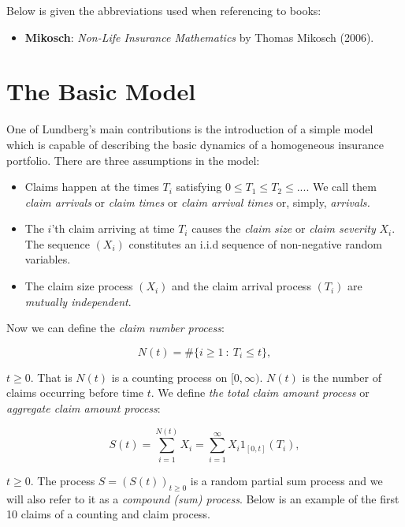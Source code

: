 \documentclass[a4paper,10pt,openany]{book}
\providecommand{\tightlist}{%
 \setlength{\itemsep}{0pt}\setlength{\parskip}{0pt}}
\begin{document}
Below is given the abbreviations used when referencing to books:

\begin{itemize}
\tightlist
\item
  \textbf{Mikosch}: \emph{Non-Life Insurance Mathematics} by Thomas Mikosch (2006).\cite{mikosch2009}
\end{itemize}

\hypertarget{the-basic-model-1}{%
\section{The Basic Model}\label{the-basic-model-1}}

One of Lundberg's main contributions is the introduction of a simple model which is capable of describing the basic dynamics of a homogeneous insurance portfolio. There are three assumptions in the model:

\begin{itemize}
\tightlist
\item
  Claims happen at the times \(T_i\) satisfying \(0\le T_1 \le T_2 \le...\). We call them \emph{claim arrivals} or \emph{claim times} or \emph{claim arrival times} or, simply, \emph{arrivals.}
\item
  The \(i\)'th claim arriving at time \(T_i\) causes the \emph{claim size} or \emph{claim severity} \(X_i\). The sequence \((X_i)\) constitutes an i.i.d sequence of non-negative random variables.
\item
  The claim size process \((X_i)\) and the claim arrival process \((T_i)\) are \emph{mutually independent}.
\end{itemize}

Now we can define the \emph{claim number process}:

\[
N(t)=\#\{i\ge 1\ :\ T_i\le t\},
\]

\(t\ge 0\). That is \(N(t)\) is a counting process on \([0,\infty)\). \(N(t)\) is the number of claims occurring before time \(t\). We define \emph{the total claim amount process} or \emph{aggregate claim amount process}:

\[
S(t)=\sum_{i=1}^{N(t)}X_i=\sum_{i=1}^\infty X_i 1_{[0,t]}(T_i),
\]

\(t\ge 0\). The process \(S=(S(t))_{t\ge 0}\) is a random partial sum process and we will also refer to it as a \emph{compound (sum) process}. Below is an example of the first 10 claims of a counting and claim process.
\end{document}
